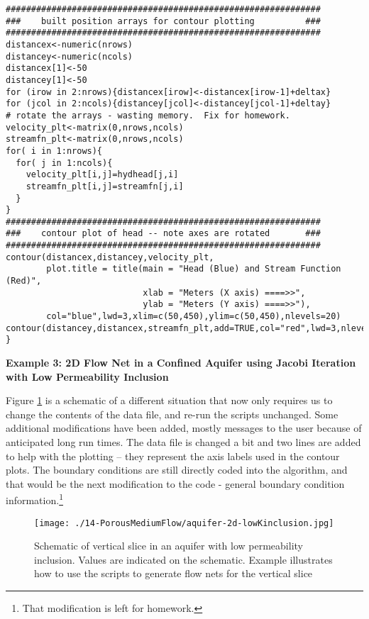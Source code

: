 \begin{lstlisting}[caption= R code demonstrating an Velocity Potential -- Stream Function Simulator for 2D Steady Flow.  This code fragment implements the contour plotting \\ , label=lst:2by2contour]
##############################################################
###    built position arrays for contour plotting          ###
##############################################################
distancex<-numeric(nrows)
distancey<-numeric(ncols)
distancex[1]<-50
distancey[1]<-50
for (irow in 2:nrows){distancex[irow]<-distancex[irow-1]+deltax}
for (jcol in 2:ncols){distancey[jcol]<-distancey[jcol-1]+deltay}
# rotate the arrays - wasting memory.  Fix for homework.
velocity_plt<-matrix(0,nrows,ncols) 
streamfn_plt<-matrix(0,nrows,ncols) 
for( i in 1:nrows){
  for( j in 1:ncols){
    velocity_plt[i,j]=hydhead[j,i]
    streamfn_plt[i,j]=streamfn[j,i]
  }
}
##############################################################
###    contour plot of head -- note axes are rotated       ###
##############################################################
contour(distancex,distancey,velocity_plt,
        plot.title = title(main = "Head (Blue) and Stream Function (Red)",
                           xlab = "Meters (X axis) ====>>", 
                           ylab = "Meters (Y axis) ====>>"),
        col="blue",lwd=3,xlim=c(50,450),ylim=c(50,450),nlevels=20)
contour(distancey,distancex,streamfn_plt,add=TRUE,col="red",lwd=3,nlevels=20)
}\end{lstlisting}

\clearpage
\textbf{Example 3: 2D Flow Net in a Confined Aquifer using Jacobi Iteration with Low Permeability Inclusion}

Figure \ref{fig:aquifer-2d-lowKinclusion} is a schematic of a different situation that now only requires us to change the contents of the data file, and re-run the scripts unchanged.  
Some additional modifications have been added, mostly messages to the user because of anticipated long run times.    
The data file is changed a bit and two lines are added to help with the plotting -- they represent the axis labels used in the contour plots.
The boundary conditions are still directly coded into the algorithm, and that would be the next modification to the code - general boundary condition information.\footnote{That modification is left for homework.}

\begin{figure}[h!] %
   \centering
   \texttt{[image: ./14-PorousMediumFlow/aquifer-2d-lowKinclusion.jpg]} 
   \caption{Schematic of vertical slice in an aquifer with low permeability inclusion.  Values are indicated on the schematic.  Example illustrates how to use the scripts to generate flow nets for the vertical slice }
   \label{fig:aquifer-2d-lowKinclusion}
\end{figure}

